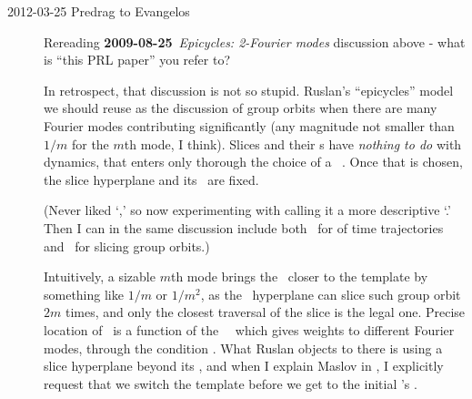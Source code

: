\begin{description}
\item[2012-03-25 Predrag to Evangelos]
Rereading  {\bf 2009-08-25}~{\em Epicycles:
2-Fourier modes} discussion above - what is ``{this PRL paper}'' you
refer to?

In retrospect, that discussion is not so stupid. Ruslan's ``epicycles''
model we should reuse as the discussion of group orbits when there are
many Fourier modes contributing significantly (any magnitude not smaller
than $1/m$ for the $m$th mode, I think). Slices and their \chartBord s
have \emph{nothing to do} with dynamics, that enters only thorough the
choice of a \template\ \slicep. Once that is chosen, the slice hyperplane
and its \chartBord\ are fixed.

(Never liked `\sset,' so now experimenting with calling it a more
descriptive `\chartBord.' Then I can in the same discussion include both
\poincBord\ for {\PoincSec} of time trajectories and \chartBord\ for
slicing group orbits.)

Intuitively, a sizable $m$th mode brings the \chartBord\ closer to the
template by something like $1/m$ or $1/m^2$, as the \slice\ hyperplane
can slice such group orbit $2m$ times, and only the closest traversal of
the slice is the legal one. Precise location of \chartBord\ is a function
of the \template\ \slicep\ which gives weights to different Fourier
modes, through the condition .  What Ruslan objects to
there is using a slice hyperplane beyond its \chartBord, and when I
explain Maslov in , I explicitly request that we
switch the template before we get to the initial \template's \chartBord.


\end{description}



\renewcommand{\ssp}{a}
